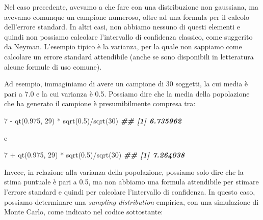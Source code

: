 \documentclass[
  12pt,
]{book}
\newenvironment{Shaded}{\begin{snugshade}}{\end{snugshade}}
\newcommand{\DecValTok}[1]{\textcolor[rgb]{0.00,0.00,0.81}{#1}}
\newcommand{\DocumentationTok}[1]{\textcolor[rgb]{0.56,0.35,0.01}{\textbf{\textit{#1}}}}
\newcommand{\FloatTok}[1]{\textcolor[rgb]{0.00,0.00,0.81}{#1}}
\newcommand{\FunctionTok}[1]{\textcolor[rgb]{0.00,0.00,0.00}{#1}}
\newcommand{\NormalTok}[1]{#1}
\newcommand{\SpecialCharTok}[1]{\textcolor[rgb]{0.00,0.00,0.00}{#1}}
\begin{document}
Nel caso precedente, avevamo a che fare con una distribuzione non gaussiana, ma avevamo comunque un campione numeroso, oltre ad una formula per il calcolo dell'errore standard. In altri casi, non abbiamo nessuno di questi elementi e quindi non possiamo calcolare l'intervallo di confidenza classico, come suggerito da Neyman. L'esempio tipico è la varianza, per la quale non sappiamo come calcolare un errore standard attendibile (anche se sono disponibili in letteratura alcune formule di uso comune).

Ad esempio, immaginiamo di avere un campione di 30 soggetti, la cui media è pari a 7.0 e la cui varianza è 0.5. Possiamo dire che la media della popolazione che ha generato il campione è presumibilmente compresa tra:

\begin{Shaded}
\begin{Highlighting}[]
\DecValTok{7} \SpecialCharTok{{-}} \FunctionTok{qt}\NormalTok{(}\FloatTok{0.975}\NormalTok{, }\DecValTok{29}\NormalTok{) }\SpecialCharTok{*} \FunctionTok{sqrt}\NormalTok{(}\FloatTok{0.5}\NormalTok{)}\SpecialCharTok{/}\FunctionTok{sqrt}\NormalTok{(}\DecValTok{30}\NormalTok{)}
\DocumentationTok{\#\# [1] 6.735962}
\end{Highlighting}
\end{Shaded}

e

\begin{Shaded}
\begin{Highlighting}[]
\DecValTok{7} \SpecialCharTok{+} \FunctionTok{qt}\NormalTok{(}\FloatTok{0.975}\NormalTok{, }\DecValTok{29}\NormalTok{) }\SpecialCharTok{*} \FunctionTok{sqrt}\NormalTok{(}\FloatTok{0.5}\NormalTok{)}\SpecialCharTok{/}\FunctionTok{sqrt}\NormalTok{(}\DecValTok{30}\NormalTok{)}
\DocumentationTok{\#\# [1] 7.264038}
\end{Highlighting}
\end{Shaded}

Invece, in relazione alla varianza della popolazione, possiamo solo dire che la stima puntuale è pari a 0.5, ma non abbiamo una formula attendibile per stimare l'errore standard e quindi per calcolare l'intervallo di confidenza. In questo caso, possiamo determinare una \emph{sampling distribution} empirica, con una simulazione di Monte Carlo, come indicato nel codice sottostante:
\end{document}

